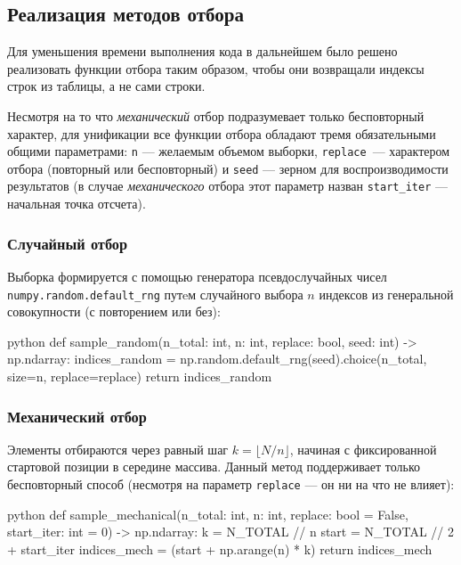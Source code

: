 \subsection{Реализация методов отбора}

Для уменьшения времени выполнения кода в дальнейшем было решено реализовать функции отбора таким образом, чтобы они возвращали индексы строк из таблицы, а не сами строки.

Несмотря на то что \textit{механический} отбор подразумевает только бесповторный характер, для унификации все функции отбора обладают тремя обязательными общими параметрами: \texttt{n} --- желаемым объемом выборки, \texttt{replace}~--- характером отбора (повторный или бесповторный) и \texttt{seed} --- зерном для воспроизводимости результатов (в случае \textit{механического} отбора этот параметр назван \texttt{start\_iter} --- начальная точка отсчета).

\subsubsection*{Случайный отбор}

Выборка формируется с помощью генератора псевдослучайных чисел\\
\texttt{numpy.random.default\_rng} путeм случайного выбора $n$ индексов из генеральной совокупности (с повторением или без):

\begin{mintedbox}{python}
def sample_random(n_total: int, n: int, replace: bool, seed: int) -> np.ndarray:
    indices_random = np.random.default_rng(seed).choice(n_total, size=n, replace=replace)
    return indices_random
\end{mintedbox}

\subsubsection*{Механический отбор}

Элементы отбираются через равный шаг $k = \lfloor N / n \rfloor$, начиная с фиксированной стартовой позиции в середине массива. Данный метод поддерживает только бесповторный способ (несмотря на параметр \texttt{replace} --- он ни на что не влияет):

\begin{mintedbox}{python}
def sample_mechanical(n_total: int, n: int, replace: bool = False, start_iter: int = 0) -> np.ndarray:
    k = N_TOTAL // n
    start = N_TOTAL // 2 + start_iter
    indices_mech = (start + np.arange(n) * k) %
    return indices_mech
\end{mintedbox}

